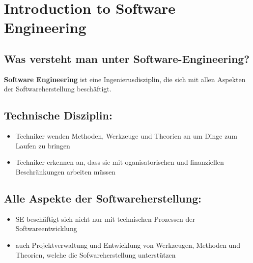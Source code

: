 \chapter{Introduction to Software Engineering}
\section{Was versteht man unter Software-Engineering?}
\textbf{Software Engineering} ist eine Ingenierusdisziplin, die sich mit allen Aspekten der Softwareherstellung beschäftigt.
\section{Technische Disziplin:}
\begin{itemize}
    \item Techniker wenden Methoden, Werkzeuge und Theorien an um Dinge zum Laufen zu bringen
    \item Techniker erkennen an, dass sie mit oganisatorischen und finanziellen Beschränkungen arbeiten müssen
\end{itemize}
\section{Alle Aspekte der Softwareherstellung:}
\begin{itemize}
    \item SE beschäftigt sich nicht nur mit technischen Prozessen der Softwareentwicklung
    \item auch Projektverwaltung und Entwicklung von Werkzeugen, Methoden und Theorien, welche die Sofwareherstellung unterstützen
\end{itemize}
